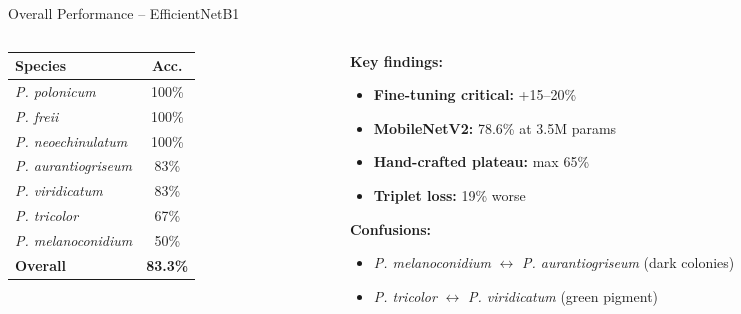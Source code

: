 \documentclass[aspectratio=169]{beamer}
\begin{document}
\begin{frame}{Overall Performance -- EfficientNetB1}
  \begin{columns}[T]
    \begin{column}{0.45\textwidth}
      \begin{table}
        \centering
        \small
        \begin{tabular}{@{}lc@{}}
          \toprule
          \textbf{Species} & \textbf{Acc.} \\
          \midrule
          \textit{P. polonicum} & 100\% \\
          \textit{P. freii} & 100\% \\
          \textit{P. neoechinulatum} & 100\% \\
          \textit{P. aurantiogriseum} & 83\% \\
          \textit{P. viridicatum} & 83\% \\
          \textit{P. tricolor} & 67\% \\
          \textit{P. melanoconidium} & 50\% \\
          \midrule
          \rowcolor{mycoLight!20}
          \textbf{Overall} & \textbf{83.3\%} \\
          \bottomrule
        \end{tabular}
      \end{table}
    \end{column}
    \begin{column}{0.55\textwidth}
      \textbf{Key findings:}
      \begin{itemize}
        \item \textbf{Fine-tuning critical:} +15--20\%
        \item \textbf{MobileNetV2:} 78.6\% at 3.5M params
        \item \textbf{Hand-crafted plateau:} max 65\%
        \item \textbf{Triplet loss:} 19\% worse
      \end{itemize}

      \textbf{Confusions:}
      \begin{itemize}
        \item \textit{P. melanoconidium} $\leftrightarrow$ \textit{P. aurantiogriseum} (dark colonies)
        \item \textit{P. tricolor} $\leftrightarrow$ \textit{P. viridicatum} (green pigment)
      \end{itemize}
    \end{column}
  \end{columns}
\end{frame}
\end{document}
